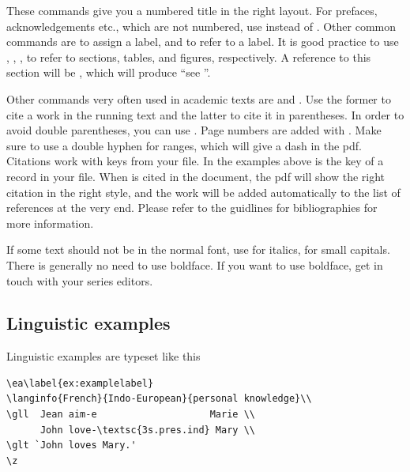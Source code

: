 These commands give you a numbered title in the right layout. For prefaces, acknowledgements etc., which are not numbered, use  instead of . 
Other common commands are 
to assign a label, and 
to refer to a label. It is good practice to use 
,
,
,
to refer to sections, tables, and figures, respectively. A reference to this section will be , which will produce ``see ''.

Other commands very often used in academic texts are  and . Use the former to cite a work in the running text and the latter to cite it in parentheses. In order to avoid double parentheses, you can use  . Page numbers are added with . Make sure to use a double hyphen for ranges, which will give a dash in the pdf. Citations work with keys from your \bibtex file. In the examples above  is the key of a record in your \bibtex file. When  is cited in the document, the pdf will show the right citation in the right style, and the work will be added automatically to the list of references at the very end. Please refer to the guidlines for bibliographies for more information.


If some text should not be in the normal font, use 
 for italics, 
 for small capitals. There is generally no need to use boldface. If you want to use boldface, get in touch with your series editors.

\subsection{Linguistic examples}
Linguistic examples are typeset like this

\begin{verbatim}
\ea\label{ex:examplelabel}
\langinfo{French}{Indo-European}{personal knowledge}\\
\gll  Jean aim-e                    Marie \\
      John love-\textsc{3s.pres.ind} Mary \\
\glt `John loves Mary.'    
\z
\end{verbatim}

